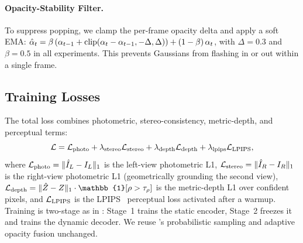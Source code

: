 \paragraph{Opacity-Stability Filter.}
To suppress popping, we clamp the per-frame opacity delta and apply a
soft EMA: $\hat{\alpha}_t = \beta\,(\alpha_{t-1} + \text{clip}(\alpha_t -
\alpha_{t-1}, -\Delta, \Delta)) + (1-\beta)\, \alpha_t$, with
$\Delta = 0.3$ and $\beta = 0.5$ in all experiments. This prevents
Gaussians from flashing in or out within a single frame.

\subsection{Training Losses}
\label{sec:method-loss}

The total loss combines photometric, stereo-consistency, metric-depth,
and perceptual terms:
\begin{equation}
\label{eq:loss}
\mathcal{L} = \mathcal{L}_{\text{photo}} + \lambda_\text{stereo} \mathcal{L}_{\text{stereo}} +
\lambda_\text{depth} \mathcal{L}_{\text{depth}} + \lambda_\text{lpips} \mathcal{L}_{\text{LPIPS}},
\end{equation}
where $\mathcal{L}_{\text{photo}} = \|\hat{I}_L - I_L\|_1$ is the left-view photometric L1,
$\mathcal{L}_{\text{stereo}} = \|\hat{I}_R - I_R\|_1$ is the right-view photometric L1
(geometrically grounding the second view),
$\Ldepth = \|\hat{\depth} - \depth\|_1 \cdot \mathbb{1}[\rho > \tau_\rho]$
is the metric-depth L1 over confident pixels, and $\mathcal{L}_{\text{LPIPS}}$ is the
LPIPS~\cite{zhang2018lpips} perceptual loss activated after a warmup.
Training is two-stage as in \StreamSplat: Stage~1 trains the static
encoder, Stage~2 freezes it and trains the dynamic decoder. We reuse
\StreamSplat's probabilistic sampling and adaptive opacity fusion
unchanged.
